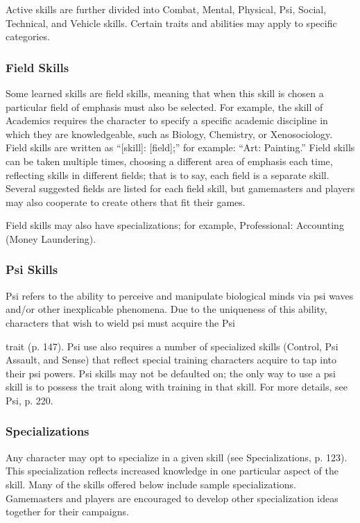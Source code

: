 Active skills are further divided into Combat,
Mental, Physical, Psi, Social, Technical, and Vehicle
skills. Certain traits and abilities may apply to specific
categories.


 \subsubsection{Field Skills}
Some learned skills are field skills, meaning that when
this skill is chosen a particular field of emphasis must
also be selected. For example, the skill of Academics
requires the character to specify a specific academic
discipline in which they are knowledgeable, such as
Biology, Chemistry, or Xenosociology. Field skills are
written as “[skill]: [field];” for example: “Art: Painting.” Field skills can be taken multiple times, choosing
a different area of emphasis each time, reflecting skills
in different fields; that is to say, each field is a separate
skill. Several suggested fields are listed for each field
skill, but gamemasters and players may also cooperate
to create others that fit their games.

Field skills may also have specializations; for example, Professional: Accounting (Money Laundering).


 \subsubsection{Psi Skills}
Psi refers to the ability to perceive and manipulate
biological minds via psi waves and/or other inexplicable phenomena. Due to the uniqueness of this ability,
characters that wish to wield psi must acquire the Psi

trait (p. 147). Psi use also requires a number of specialized skills (Control, Psi Assault, and Sense) that reflect
special training characters acquire to tap into their psi
powers. Psi skills may not be defaulted on; the only
way to use a psi skill is to possess the trait along with
training in that skill. For more details, see Psi, p. 220.


 \subsubsection{Specializations}
Any character may opt to specialize in a given skill
(see Specializations, p. 123). This specialization reflects
increased knowledge in one particular aspect of the
skill. Many of the skills offered below include sample
specializations. Gamemasters and players are encouraged to develop other specialization ideas together for
their campaigns.

